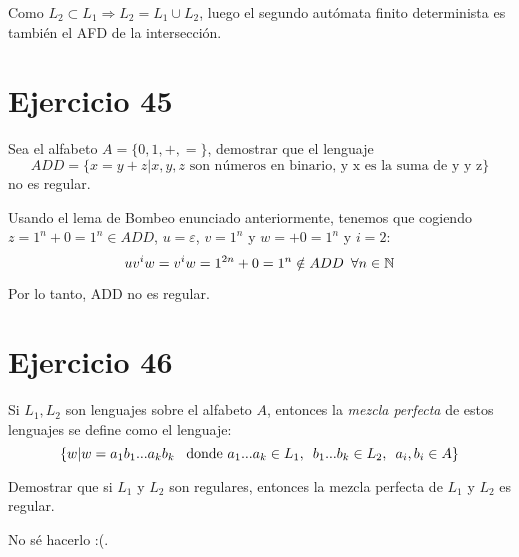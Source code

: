 \documentclass[a4paper, 11pt]{article}
\begin{document}
\begin{itemize}
\begin{center}
\end{center}

\end{itemize}

Como $L_2\subset L_1 \Longrightarrow L_2 = L_1\cup L_2$, luego el segundo autómata finito determinista es también el AFD de la intersección.

\section*{Ejercicio 45}
Sea el alfabeto $A=\{0,1,+,=\}$, demostrar que el lenguaje
\[
ADD=\{x=y+z|x,y,z \text{ son números en binario, y x es la suma de y y z}\}
\]
no es regular.

Usando el lema de Bombeo enunciado anteriormente, tenemos que cogiendo $z=1^n+0=1^n\in ADD$, $u=\varepsilon$, $v=1^n$ y $w=+0=1^n$ y $i=2$:
\[
uv^iw=v^iw=1^{2n}+0=1^n \notin ADD \enskip \forall n \in \mathbb{N}
\]

Por lo tanto, ADD no es regular.

\section*{Ejercicio 46}
Si $L_1,L_2$ son lenguajes sobre el alfabeto $A$, entonces la \textit{mezcla perfecta} de estos lenguajes se define como el lenguaje:
\[
\{w|w=a_1b_1...a_kb_k \enskip \text{ donde } a_1...a_k\in L_1, \enskip b_1...b_k\in L_2, \enskip a_i, b_i \in A\}
\]

Demostrar que si $L_1$ y $L_2$ son regulares, entonces la mezcla perfecta de $L_1$ y $L_2$ es regular.

No sé hacerlo :(.
\end{document}
